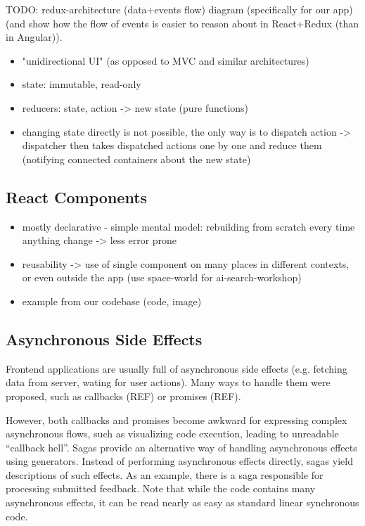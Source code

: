 TODO: redux-architecture (data+events flow) diagram (specifically for our app) (and show how the flow of events is easier to reason about in React+Redux (than in Angular)).

\begin{itemize}
\item "unidirectional UI" (as opposed to MVC and similar architectures)
\item state: immutable, read-only
\item reducers: state, action -> new state (pure functions)
\item changing state directly is not possible, the only way is to dispatch action -> dispatcher then takes dispatched actions one by one and reduce them (notifying connected containers about the new state)
\end{itemize}

\subsection{React Components}

\begin{itemize}
\item mostly declarative - simple mental model: rebuilding from scratch every time anything change -> less error prone
\item reusability -> use of single component on many places in different contexts,
  or even outside the app (use space-world for ai-search-workshop)
\item example from our codebase (code, image)
\end{itemize}

\subsection{Asynchronous Side Effects}
\label{sec:robomission-asynchronous-side-effects}

Frontend applications are usually full of asynchronous side effects
(e.g. fetching data from server, wating for user actions).
Many ways to handle them were proposed,
such as callbacks (REF) or promises (REF).

However, both callbacks and promises become awkward for expressing complex
asynchronous flows, such as visualizing code execution,
leading to unreadable ``callback hell''. %
Sagas provide an alternative way of handling asynchronous effects using generators.
Instead of performing asynchronous effects directly, sagas yield
descriptions of such effects.
As an example, there is a saga responsible for processing
submitted feedback.
Note that while the code contains many asynchronous effects,
it can be read nearly as easy as standard linear synchronous code.

